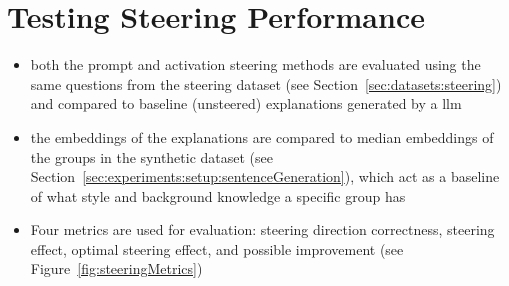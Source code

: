 \begin{table}[ht]
\begin{subtable}[b]{0.49\linewidth}
    \resultEmbedderToMediansForeignDomain{}%
    \label{table:embedder:mediansForeignDomain}
  \end{subtable}
\end{table}

\section{Testing Steering Performance}%
\label{sec:evaluation:steering}
\begin{itemize}
  \item both the prompt and activation steering methods are evaluated using the same questions from the steering dataset (see Section~\ref{sec:datasets:steering}) and compared to baseline (unsteered) explanations generated by a \acl{llm}
  \item the embeddings of the explanations are compared to median embeddings of the groups in the synthetic dataset (see Section~\ref{sec:experiments:setup:sentenceGeneration}), which act as a baseline of what style and background knowledge a specific group has
  \item Four metrics are used for evaluation: steering direction correctness, steering effect, optimal steering effect, and possible improvement (see Figure~\ref{fig:steeringMetrics})
\end{itemize}


